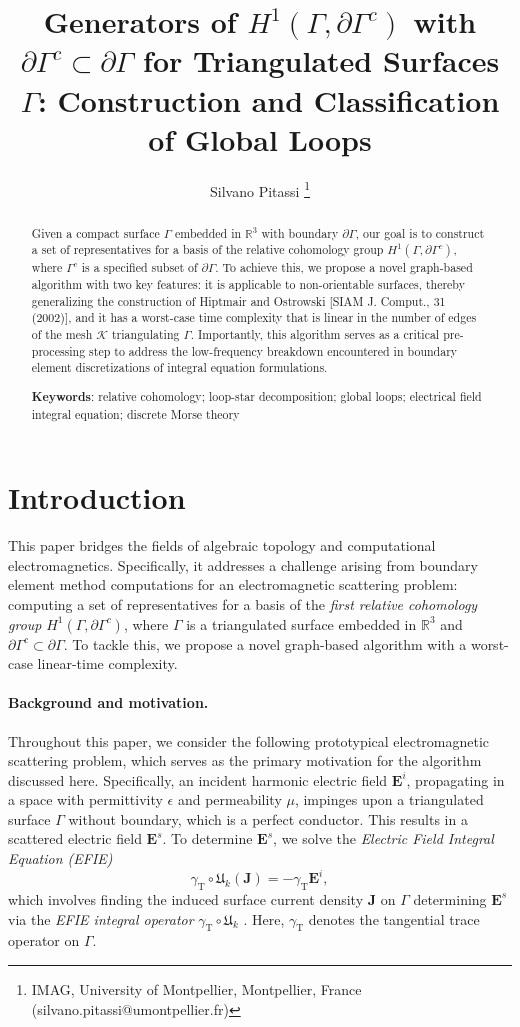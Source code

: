 \documentclass[a4paper,twoside,10pt]{article}
\author{
\normalsize{
}}
\date{}
\title{{\textbf{\large{Generators of $H^1(\Gamma, \partial \Gamma^c)$ with $\partial \Gamma^c \subset \partial \Gamma$ for Triangulated Surfaces $\Gamma$: Construction and Classification of Global Loops}}}}
\date{}
\author{{Silvano Pitassi \thanks{IMAG, University of Montpellier, Montpellier, France (silvano.pitassi@umontpellier.fr)}}}
\theoremstyle{plain}
\theoremstyle{definition}
\theoremstyle{remark}
\newcommand{\mc}{\mathcal}
\newcommand{\R}{\mathbb{R}}
\begin{document}
\maketitle
\begin{abstract}
\noindent
Given a compact surface $\Gamma$ embedded in $\R^3$ with boundary $\partial \Gamma$, our goal is to construct a set of representatives for a basis of the relative cohomology group $H^1(\Gamma, \partial \Gamma^c)$, where $\Gamma^c$ is a specified subset of $\partial \Gamma$.
To achieve this, we propose a novel graph-based algorithm with two key features: it is applicable to non-orientable surfaces, thereby generalizing the construction of Hiptmair and Ostrowski [SIAM J. Comput., 31 (2002)], and it has a worst-case time complexity that is linear in the number of edges of the mesh $\mc{K}$ triangulating $\Gamma$.
Importantly, this algorithm serves as a critical pre-processing step to address the low-frequency breakdown encountered in boundary element discretizations of integral equation formulations.
\medskip

\medskip\noindent
\textbf{Keywords}: relative cohomology; loop-star decomposition; global loops; electrical field integral equation;
discrete Morse theory
\end{abstract}

\section{Introduction}
\label{sec:intro}
This paper bridges the fields of algebraic topology and computational electromagnetics.
Specifically, it addresses a challenge arising from boundary element method computations for an electromagnetic scattering problem: computing a set of representatives for a basis of the \emph{first relative cohomology group} $H^1(\Gamma, \partial \Gamma^c)$, where $\Gamma$ is a triangulated surface embedded in $\R^3$ and $\partial \Gamma^c \subset \partial \Gamma$.
To tackle this, we propose a novel graph-based algorithm with a worst-case linear-time complexity.
\paragraph*{Background and motivation.}
Throughout this paper, we consider the following prototypical electromagnetic scattering problem, which serves as the primary motivation for the algorithm discussed here.
Specifically, an incident harmonic electric field $\bm{E}^i$, propagating in a space with permittivity $\epsilon$ and permeability $\mu$, impinges upon a triangulated surface $\Gamma$ without boundary, which is a perfect conductor.
This results in a scattered electric field $\bm{E}^s$. To determine $\bm{E}^s$, we solve the \emph{Electric Field Integral Equation (EFIE)}
\[
\gamma_{\mathrm{T}} \circ \mathfrak{U}_k(\bm{J}) = -\gamma_{\mathrm{T}} \bm{E}^i,
\]
which involves finding the induced surface current density $\bm{J}$ on $\Gamma$ determining $\bm{E}^s$ via the \emph{EFIE integral operator} $\gamma_{\mathrm{T}} \circ \mathfrak{U}_k$ \cite{buffa2003electric}.
Here, $\gamma_{\mathrm{T}}$ denotes the tangential trace operator on $\Gamma$.
\end{document}
